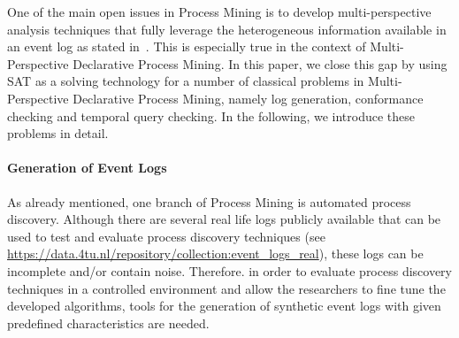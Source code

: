 


One of the main open issues in Process Mining is to develop multi-perspective analysis techniques that fully leverage the heterogeneous information available in an event log as stated in~\cite{IEEE2011:Manifesto}. This is especially true in the context of Multi-Perspective Declarative Process Mining.
In this paper, we close this gap by using SAT as a solving technology for a number of classical problems in Multi-Perspective Declarative Process Mining, namely log generation, conformance checking and temporal query checking. In the following, we introduce these problems in detail.


\paragraph{Generation of Event Logs} As already mentioned, one branch of Process Mining is automated process discovery. Although there are several real life logs publicly available that can be used to test and evaluate process discovery techniques (see \url{https://data.4tu.nl/repository/collection:event_logs_real}), these logs can be incomplete and/or contain noise. Therefore. in order to evaluate process discovery techniques in a controlled environment and allow the researchers to fine tune the developed algorithms, tools for the generation of synthetic event logs with given predefined characteristics are needed.




